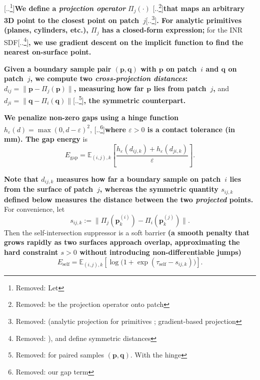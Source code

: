 \documentclass{ieeeaccess}
\providecommand{\DIFaddtex}[1]{{\color{blue}\bfseries #1}} %
\providecommand{\DIFdeltex}[1]{{\color{red}[..\footnote{\color{black}Removed: #1}]}} %
\providecommand{\DIFaddbegin}{} %
\providecommand{\DIFaddend}{} %
\providecommand{\DIFdelbegin}{} %
\providecommand{\DIFdelend}{} %
\providecommand{\DIFadd}[1]{\texorpdfstring{\DIFaddtex{#1}}{#1}} %
\providecommand{\DIFdel}[1]{\texorpdfstring{\DIFdeltex{#1}}{}} %
\begin{document}
\DIFdelbegin \DIFdel{Let }\DIFdelend \DIFaddbegin \DIFadd{We define a \emph{projection operator} }\DIFaddend $\Pi_j(\cdot)$ \DIFdelbegin \DIFdel{be the projection operator onto patch}\DIFdelend \DIFaddbegin \DIFadd{that maps an
arbitrary 3D point to the closest point on patch~}\DIFaddend $j$\DIFdelbegin \DIFdel{(analytic projection for primitives ; gradient-based projection }\DIFdelend \DIFaddbegin \DIFadd{.
For analytic primitives (planes, cylinders, etc.), $\Pi_j$ has a
closed-form expression; }\DIFaddend for the INR SDF\DIFdelbegin \DIFdel{), and define
symmetric distances }\DIFdelend \DIFaddbegin \DIFadd{, we use gradient descent
on the implicit function to find the nearest on-surface point.
}

\DIFadd{Given a boundary sample pair $(\mathbf{p},\mathbf{q})$ with $\mathbf{p}$
on patch~$i$ and $\mathbf{q}$ on patch~$j$, we compute two
\emph{cross-projection distances}:
}\DIFaddend $d_{ij}=\|\mathbf{p}-\Pi_j(\mathbf{p})\|$\DIFaddbegin \DIFadd{, measuring how far
$\mathbf{p}$ lies from patch~$j$, }\DIFaddend and
$d_{ji}=\|\mathbf{q}-\Pi_i(\mathbf{q})\|$\DIFdelbegin \DIFdel{for paired samples $(\mathbf{p},\mathbf{q})$.
With the hinge }\DIFdelend \DIFaddbegin \DIFadd{, the symmetric counterpart.
}

\DIFadd{We penalize non-zero gaps using a hinge function
}\DIFaddend $h_\varepsilon(d)=\max(0,d-\varepsilon)^2$, \DIFdelbegin \DIFdel{our gap term }\DIFdelend \DIFaddbegin \DIFadd{where $\varepsilon>0$ is a
contact tolerance (in mm). The gap energy }\DIFaddend is
\begin{equation}
E_{\mathrm{gap}}
= \mathbb{E}_{(i,j),k}\!\left[
\frac{h_{\varepsilon}(d_{ij,k})+h_{\varepsilon}(d_{ji,k})}{\varepsilon}
\right].
\end{equation}

\DIFaddbegin \DIFadd{Note that $d_{ij,k}$ measures how far a boundary sample on patch~$i$ lies from the surface of patch~$j$, whereas the symmetric quantity $s_{ij,k}$ defined below measures the distance between the two \emph{projected} points. }\DIFaddend For convenience, let
\begin{equation}
s_{ij,k}
:= \bigl\|\Pi_j(\mathbf{p}^{(i)}_k)
      - \Pi_i(\mathbf{p}^{(j)}_k)\bigr\|.
\end{equation}
Then the self-intersection suppressor is a soft barrier \DIFaddbegin \DIFadd{(a smooth penalty that grows rapidly as two surfaces approach overlap, approximating the hard constraint $s>0$ without introducing non-differentiable jumps)
}\DIFaddend \begin{equation}
E_{\mathrm{self}}
= \mathbb{E}_{(i,j),k}\!\left[
  \log\!\bigl(1 + \exp(\tau_{\mathrm{self}} - s_{ij,k})\bigr)
\right].
\end{equation}
\end{document}
